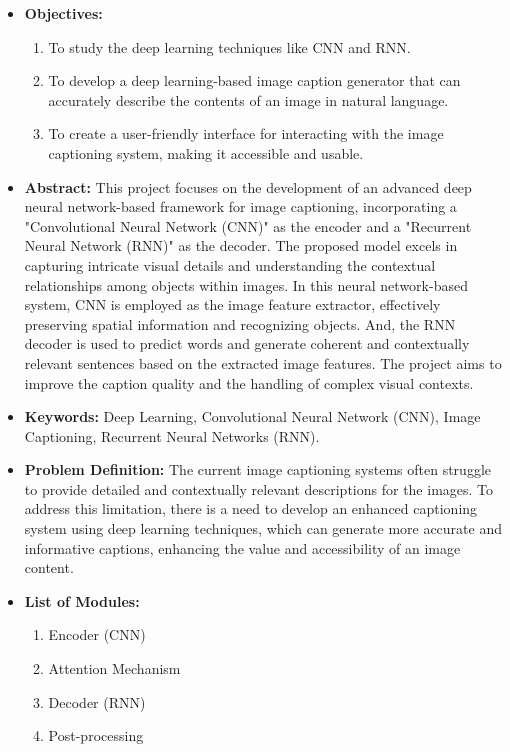 \documentclass[12pt]{report}	%
\begin{document}
{{\begin{itemize}
\item{\textbf{Objectives:}}
\begin{enumerate}
\item{To study the deep learning techniques like CNN and RNN.}
\item{To develop a deep learning-based image caption generator that can accurately describe the contents of an image in natural language.}
\item{To create a user-friendly interface for interacting with the image captioning system, making it accessible and usable.}

\end{enumerate}

\item{\textbf{Abstract:}}
\newline
This project focuses on the development of an advanced deep neural network-based framework for image captioning, incorporating a "Convolutional Neural Network (CNN)" as the encoder and a "Recurrent Neural Network (RNN)" as the decoder. The proposed model excels in capturing intricate visual details and understanding the contextual relationships among objects within images. In this neural network-based system, CNN is employed as the image feature extractor, effectively preserving spatial information and recognizing objects. And, the RNN decoder is used to predict words and generate coherent and contextually relevant sentences based on the extracted image features. The project aims to improve the caption quality and the handling of complex visual contexts.

\item{\textbf{Keywords:}}
\newline
Deep Learning, Convolutional Neural Network (CNN), Image Captioning, Recurrent Neural Networks (RNN).
\item{\textbf{Problem Definition:}}
\newline
The current image captioning systems often struggle to provide detailed and contextually relevant descriptions for the images. To address this limitation, there is a need to develop an enhanced captioning system using deep learning techniques, which can generate more accurate and informative captions, enhancing the value and accessibility of an image content.
\newpage
\item{\textbf{List of Modules:}}
\begin{enumerate}
\item{Encoder (CNN)}
\item{Attention Mechanism}
\item{Decoder (RNN)}
\item{Post-processing}
\end{enumerate}


\end{itemize}}}
\end{document}

